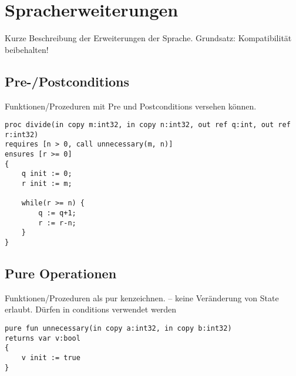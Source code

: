 \section{Spracherweiterungen}

Kurze Beschreibung der Erweiterungen der Sprache. Grundsatz: Kompatibilität beibehalten!

\subsection{Pre-/Postconditions}
Funktionen/Prozeduren mit Pre und Postconditions versehen können.


\begin{lstlisting}[caption=blubb]
proc divide(in copy m:int32, in copy n:int32, out ref q:int, out ref r:int32)
requires [n > 0, call unnecessary(m, n)]
ensures [r >= 0]
{
    q init := 0;
    r init := m;

    while(r >= n) {
        q := q+1;
        r := r-n;
    }
}
\end{lstlisting}



\subsection{Pure Operationen}
Funktionen/Prozeduren als pur kenzeichnen. -- keine Veränderung von State erlaubt. Dürfen in conditions verwendet werden
\begin{lstlisting}[caption=Pure Operationen]
pure fun unnecessary(in copy a:int32, in copy b:int32)
returns var v:bool 
{
    v init := true
}
\end{lstlisting}




